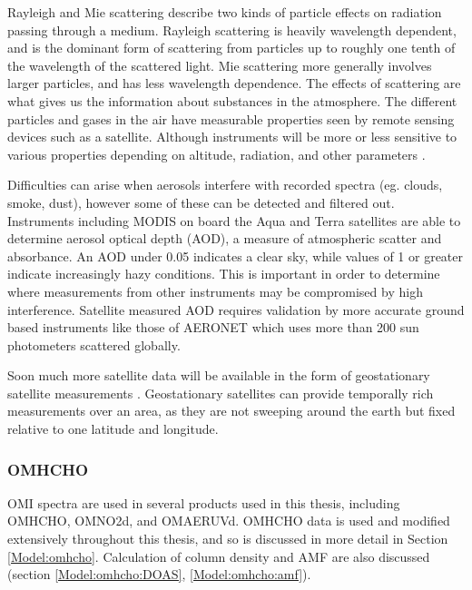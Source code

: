     
    Rayleigh and Mie scattering describe two kinds of particle effects on radiation passing through a medium.
    Rayleigh scattering is heavily wavelength dependent, and is the dominant form of scattering from particles up to roughly one tenth of the wavelength of the scattered light.
    Mie scattering more generally involves larger particles, and has less wavelength dependence.
    The effects of scattering are what gives us the information about substances in the atmosphere.
    The different particles and gases in the air have measurable properties seen by remote sensing devices such as a satellite. Although instruments will be more or less sensitive to various properties depending on altitude, radiation, and other parameters \parencite[e.g.][]{Martin2002}.
    
    Difficulties can arise when aerosols interfere with recorded spectra (eg. clouds, smoke, dust), however some of these can be detected and filtered out.
    Instruments including MODIS on board the Aqua and Terra satellites are able to determine aerosol optical depth (AOD), a measure of atmospheric scatter and absorbance. 
    An AOD under 0.05 indicates a clear sky, while values of 1 or greater indicate increasingly hazy conditions.
    This is important in order to determine where measurements from other instruments may be compromised by high interference.
    Satellite measured AOD requires validation by more accurate ground based instruments like those of AERONET which uses more than 200 sun photometers scattered globally.
    
    Soon much more satellite data will be available in the form of geostationary satellite measurements \parencite{Kwon2017}.
    Geostationary satellites can provide temporally rich measurements over an area, as they are not sweeping around the earth but fixed relative to one latitude and longitude.
    
    \subsubsection{OMHCHO}
      
      OMI spectra are used in several products used in this thesis, including OMHCHO, OMNO2d, and OMAERUVd.
      OMHCHO data is used and modified extensively throughout this thesis, and so is discussed in more detail in Section \ref{Model:omhcho}.
      Calculation of column density and AMF are also discussed (section \ref{Model:omhcho:DOAS}, \ref{Model:omhcho:amf}).
  
